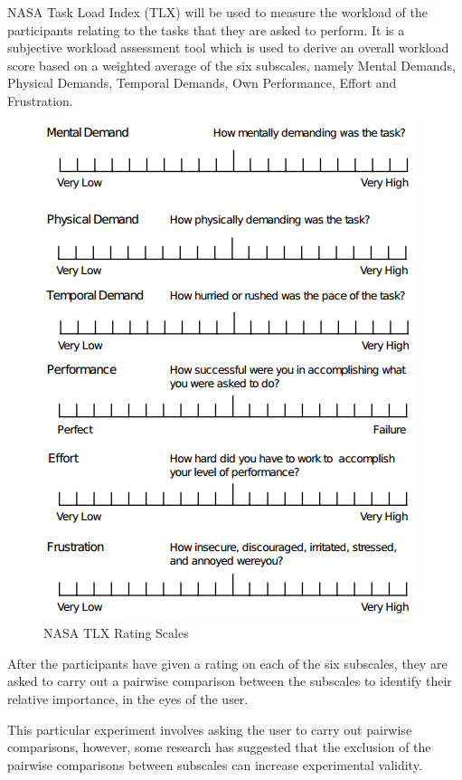 NASA Task Load Index (TLX) will be used to measure the workload of the participants relating to the tasks that they are asked to perform. It is a subjective workload assessment tool which is used to derive an overall workload score based on a weighted average of the six subscales, namely Mental Demands, Physical Demands, Temporal Demands, Own Performance, Effort and Frustration\cite{tlx}.

\begin{figure}[H]
	\centering
	\includegraphics[scale=0.4]{../images/ratingscale.png}
	\caption{NASA TLX Rating Scales}
\end{figure}

After the participants have given a rating on each of the six subscales, they are asked to carry out a pairwise comparison between the subscales to identify their relative importance, in the eyes of the user.

This particular experiment involves asking the user to carry out pairwise comparisons, however, some research has suggested that the exclusion of the pairwise comparisons between subscales can increase experimental validity\cite{tlxinvariance}.


